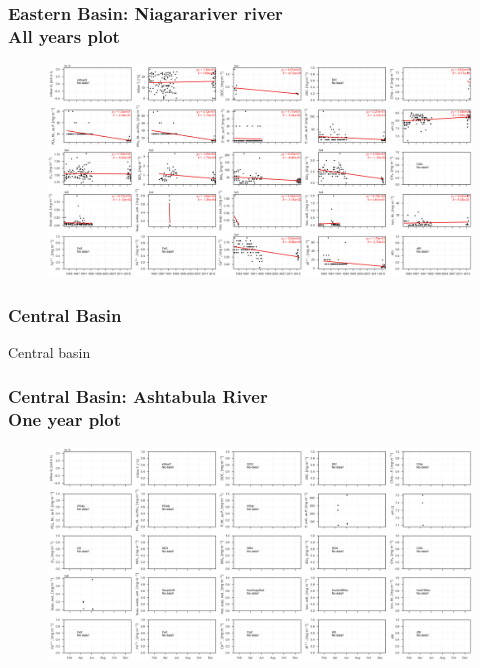 \documentclass{beamer}
\begin{document}
\begin{frame}
\frametitle{Eastern Basin: Niagarariver river\\ All years plot}
\begin{figure}
\includegraphics[width=\textwidth]{rivers/Eastern basin/plot_all niagarariver.png}
\end{figure}
\end{frame}

\subsubsection{Central Basin}

\begin{frame}
\begin{center}
\Huge Central basin
\end{center}
\end{frame}


\begin{frame}
\frametitle{Central Basin: Ashtabula River\\ One year plot}
\begin{figure}
\includegraphics[width=\textwidth]{rivers/Central basin/plot_1yr ashtabulariver.png}
\end{figure}
\end{frame}
\end{document}
